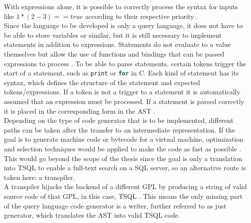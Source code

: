 With expressions alone, it is possible to correctly process the syntax for inputs like $1 * (2 - 3) == true$ according to their respective priority \parencite[cf.][p. 64]{nystrom_crafting_2021}.\\
Since the language to be developed is only a query language, it does not have to be able to store variables or similar, but it is still necessary to implement statements in addition to expressions. Statements do not evaluate to a value themselves but allow the use of functions and bindings that can be passed expressions to process \parencite[cf.][pp. 111-112]{nystrom_crafting_2021}. To be able to parse statements, certain tokens trigger the start of a statement, such as \lstinline[language=C]$print$ or \lstinline[language=C]$for$ in C. Each kind of statement has its syntax, which defines the structure of the statement and expected tokens/expressions. If a token is not a trigger to a statement it is automatically assumed that an expression must be processed. If a statement is parsed correctly it is placed in the corresponding form in the \ac{AST} \parencite[cf.][pp. 113-116]{nystrom_crafting_2021}.\\
Depending on the type of code generator that is to be implemented, different paths can be taken after the transfer to an intermediate representation. If the goal is to generate machine code or bytecode for a virtual machine, optimization and selection techniques would be applied to make the code as fast as possible \parencite[cf.][p. 15]{nystrom_crafting_2021}.\\
This would go beyond the scope of the thesis since the goal is only a translation into \ac{TSQL} to enable a full-text search on a \ac{SQL} server, so an alternative route is taken here: a transpiler.\\
A transpiler hijacks the backend of a different \ac{GPL} by producing a string of valid source code of that \ac{GPL}, in this case, \ac{TSQL} \parencite[cf.][p. 17]{nystrom_crafting_2021}. This means the only missing part of the query language code generator is a writer, further referred to as just generator, which translates the \ac{AST} into valid \ac{TSQL} code.